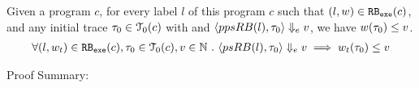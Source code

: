 \begin{thm}
  Given a program ${c}$, for every label $l$ of this program $c$ such that $(l, w) \in \mathtt{RB_{exe}}(c)$, 
  and any initial trace $\mathtt{\tau}_0 \in \mathcal{T}_0(c)$ with 
  and $\langle ppsRB(l), \mathtt{\tau}_0 \rangle \Downarrow_e v$,
  we have $ w(\mathtt{\tau}_0) \leq v $.
  \[
    \begin{array}{l}
    \forall (l, w_{t}) \in \mathtt{RB_{exe}}(c),
    \mathtt{\tau}_0 \in \mathcal{T}_0(c), 
    v \in \mathbb{N} ~.~
    \langle psRB(l), \mathtt{\tau}_0 \rangle \Downarrow_e v
    \implies
    w_{t}(\mathtt{\tau}_0) \leq v
    \end{array}
  \]
  \end{thm}
Proof Summary:

